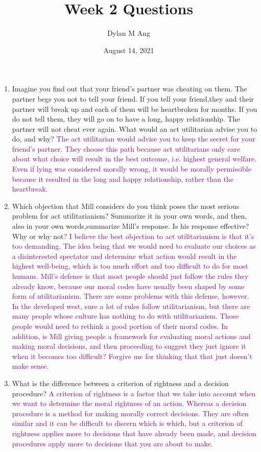 \documentclass[12pt]{article}
\title{Week 2 Questions}
\author{Dylan M Ang}
\date{August 14, 2021}
\newcommand{\ans}[1]{\textcolor{purple}{#1}}
\begin{document}
\maketitle

\begin{enumerate}
    \item Imagine you find out that your friend’s partner was cheating on them. The partner begs you not to tell your friend. If you tell your friend,they and their partner will break up and each of them will be heartbroken for months. If you do not tell them, they will go on to have a long, happy relationship. The partner will not cheat ever again. What would an act utilitarian advise you to do, and why?
    \ans{The act utilitarian would advise you to keep the secret for your friend's partner. They choose this path because act utilitarians only care about what choice will result in the best outcome, i.e. highest general welfare. Even if lying was considered morally wrong, it would be morally permissible because it resulted in the long and happy relationship, rather than the heartbreak.}

    \item Which objection that Mill considers do you think poses the most serious problem for act utilitarianism? Summarize it in your own words, and then, also in your own words,summarize Mill’s response. Is his response effective? Why or why not?
    \ans{I believe the best objection to act utilitarianism is that it's too demanding. The idea being that we would need to evaluate our choices as a disinterested spectator and determine what action would result in the highest well-being, which is too much effort and too difficult to do for most humans. Mill's defense is that most people should just follow the rules they already know, because our moral codes have usually been shaped by some form of utilitarianism. There are some problems with this defense, however. In the developed west, sure a lot of rules follow utilitarianism, but there are many people whose culture has nothing to do with utilitarianism. Those people would need to rethink a good portion of their moral codes. In addition, is Mill giving people a framework for evaluating moral actions and making moral decisions, and then proceeding to suggest they just ignore it when it becomes too difficult? Forgive me for thinking that that just doesn't make sense.}

    \item What is the difference between a criterion of rightness and a decision procedure?
    \ans{A criterion of rightness is a factor that we take into account when we want to determine the moral rightness of an action. Whereas a decision procedure is a method for making morally correct decisions. They are often similar and it can be difficult to discern which is which, but a criterion of rightness applies more to decisions that have already been made, and decision procedures apply more to decisions that you are about to make.}


\end{enumerate}
\end{document}
